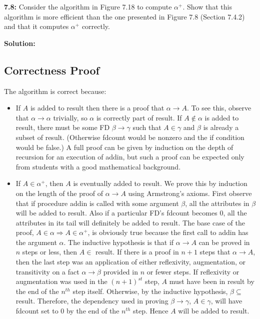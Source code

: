 \documentclass[12pt,a4paper]{article}
\begin{document}
\begin{questionbox}
\textbf{7.8:} Consider the algorithm in Figure 7.18 to compute $\alpha^+$. Show that this algorithm is more efficient than the one presented in Figure 7.8 (Section 7.4.2) and that it computes $\alpha^+$ correctly.
\end{questionbox}

\textbf{Solution:}

\subsection{Correctness Proof}

The algorithm is correct because:

\begin{itemize}
    \item If $A$ is added to result then there is a proof that $\alpha \rightarrow A$. To see this, observe that $\alpha \rightarrow \alpha$ trivially, so $\alpha$ is correctly part of result. If $A \notin \alpha$ is added to result, there must be some FD $\beta \rightarrow \gamma$ such that $A \in \gamma$ and $\beta$ is already a subset of result. (Otherwise fdcount would be nonzero and the if condition would be false.) A full proof can be given by induction on the depth of recursion for an execution of addin, but such a proof can be expected only from students with a good mathematical background.
    
    \item If $A \in \alpha^+$, then $A$ is eventually added to result. We prove this by induction on the length of the proof of $\alpha \rightarrow A$ using Armstrong's axioms. First observe that if procedure addin is called with some argument $\beta$, all the attributes in $\beta$ will be added to result. Also if a particular FD's fdcount becomes 0, all the attributes in its tail will definitely be added to result. The base case of the proof, $A \in \alpha \Rightarrow A \in \alpha^+$, is obviously true because the first call to addin has the argument $\alpha$. The inductive hypothesis is that if $\alpha \rightarrow A$ can be proved in $n$ steps or less, then $A \in$ result. If there is a proof in $n + 1$ steps that $\alpha \rightarrow A$, then the last step was an application of either reflexivity, augmentation, or transitivity on a fact $\alpha \rightarrow \beta$ provided in $n$ or fewer steps. If reflexivity or augmentation was used in the $(n + 1)^{st}$ step, $A$ must have been in result by the end of the $n^{th}$ step itself. Otherwise, by the inductive hypothesis, $\beta \subseteq$ result. Therefore, the dependency used in proving $\beta \rightarrow \gamma$, $A \in \gamma$, will have fdcount set to 0 by the end of the $n^{th}$ step. Hence $A$ will be added to result.
\end{itemize}
\end{document}
